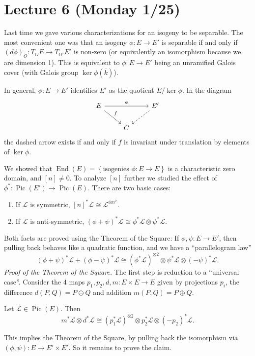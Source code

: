 \section{Lecture 6 (Monday 1/25)}
Last time we gave various characterizations for an isogeny to be separable.
The most convenient one was that an isogeny \( \phi \colon E \to E' \) is separable if and only if \( (d\phi)_O \colon T_O E \to T_{O'}E' \) is non-zero (or equivalently an isomorphism because we are dimension 1).
This is equivalent to \( \phi \colon E \to E' \) being an unramified Galois cover (with Galois group \( \ker \phi ( \overline{k} ) \)).

In general, \( \phi \colon E \to E' \) identifies \( E' \) as the quotient \( E / \ker \phi \).
In the diagram
\[
\begin{tikzcd}
  E \arrow[rr,"\phi"] \arrow[dr,"f"] & & E' \arrow[dl,dashed] \\
  & C & 
\end{tikzcd}
\]
the dashed arrow exists if and only if \( f \) is invariant under translation by elements of \( \ker \phi  \).

We showed that \( \operatorname{End}(E) = \left\lbrace \text{isogenies } \phi \colon E \to E \right\rbrace \) is a characteristic zero domain, and \( [n] \neq 0 \).
To analyze \( [n] \) further we studied the effect of \( \phi^* \colon \operatorname{Pic}(E') \to \operatorname{Pic}(E) \).
There are two basic cases:
\begin{enumerate}
\item If \( \mathcal{L} \) is symmetric, \( [n]^* \mathcal{L} \cong \mathcal{L}^{\otimes n^2} \).
\item If \( \mathcal{L} \) is anti-symmetric, \( \left( \phi + \psi \right)^* \mathcal{L} \cong \phi^* \mathcal{L} \otimes \psi^* \mathcal{L} \).  
\end{enumerate}
Both facts are proved using the Theorem of the Square: If \( \phi,\psi \colon E \to E' \), then pulling back behaves like a quadratic function, and we have a ``parallelogram law''
\[ (\phi + \psi)^* \mathcal{L} + (\phi - \psi)^* \mathcal{L} \cong (\phi^* \mathcal{L})^{\otimes 2} \otimes \psi^* \mathcal{L} \otimes (-\psi)^* \mathcal{L} . \]
\textit{Proof of the Theorem of the Square.}
The first step is reduction to a ``universal case''.
Consider the 4 maps \( p_1,p_2,d,m \colon E \times E \to E \) given by projections \( p_i \), the difference \( d(P,Q) = P \ominus Q \) and addition \( m(P,Q) = P\oplus Q \).
\begin{claim}
  Let \( \mathcal{L} \in \operatorname{Pic}(E) \). Then \[ m^* \mathcal{L} \otimes d^* \mathcal{L} \cong (p_1^* \mathcal{L})^{\otimes 2} \otimes p_2^* \mathcal{L} \otimes (-p_2)^* \mathcal{L} . \]
\end{claim}
This implies the Theorem of the Square, by pulling back the isomorphism via \( (\phi,\psi) \colon E \to E'\times E' \). So it remains to prove the claim.

